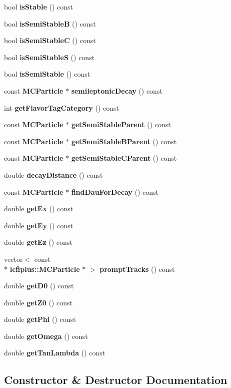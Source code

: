 \begin{DoxyCompactItemize}
\item 
bool {\bf is\-Stable} () const 
\item 
bool {\bf is\-Semi\-Stable\-B} () const 
\item 
bool {\bf is\-Semi\-Stable\-C} () const 
\item 
bool {\bf is\-Semi\-Stable\-S} () const 
\item 
bool {\bf is\-Semi\-Stable} () const 
\item 
const {\bf M\-C\-Particle} $\ast$ {\bf semileptonic\-Decay} () const 
\item 
int {\bf get\-Flavor\-Tag\-Category} () const 
\item 
const {\bf M\-C\-Particle} $\ast$ {\bf get\-Semi\-Stable\-Parent} () const 
\item 
const {\bf M\-C\-Particle} $\ast$ {\bf get\-Semi\-Stable\-B\-Parent} () const 
\item 
const {\bf M\-C\-Particle} $\ast$ {\bf get\-Semi\-Stable\-C\-Parent} () const 
\item 
double {\bf decay\-Distance} () const 
\item 
const {\bf M\-C\-Particle} $\ast$ {\bf find\-Dau\-For\-Decay} () const 
\item 
double {\bf get\-Ex} () const 
\item 
double {\bf get\-Ey} () const 
\item 
double {\bf get\-Ez} () const 
\item 
vector$<$ const \\*
{\bf lcfiplus\-::\-M\-C\-Particle} $\ast$ $>$ {\bf prompt\-Tracks} () const 
\item 
double {\bf get\-D0} () const 
\item 
double {\bf get\-Z0} () const 
\item 
double {\bf get\-Phi} () const 
\item 
double {\bf get\-Omega} () const 
\item 
double {\bf get\-Tan\-Lambda} () const 
\end{DoxyCompactItemize}


\subsection{Constructor \& Destructor Documentation}
